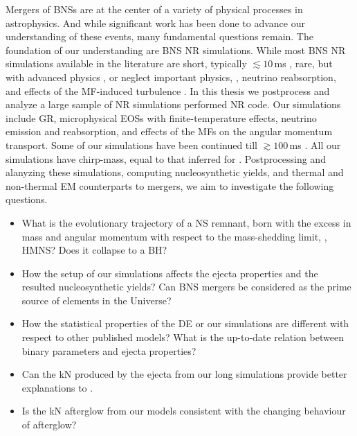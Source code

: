 Mergers of \acp{BNS} are at the center of a variety of 
physical processes in astrophysics. And while significant work 
has been done to advance our understanding of these events, many 
fundamental questions remain. 
%
The foundation of our understanding are \ac{BNS} \ac{NR} simulations.
While most \ac{BNS} \ac{NR} simulations available in the literature 
are short, typically ${\lesssim}10\,$ms \pmerg, rare, but with 
advanced physics \citep[\eg][]{Vincent:2019kor}, 
or neglect important physics, \eg, neutrino reabsorption, 
and effects of the \ac{MF}-induced turbulence \citep[\eg][]{Lehner:2016lxy}. 
%
In this thesis we postprocess and analyze a large sample of 
\ac{NR} simulations performed \wisky{} \ac{NR} code.
Our simulations include \ac{GR}, microphysical \acp{EOS} with finite-temperature 
effects, neutrino emission and reabsorption, and effects of the 
\acp{MF} on the angular momentum transport. Some of 
our simulations have been continued till ${\gtrsim}100\,$ms \pmerg{}. 
All our simulations have chirp-mass, equal to that inferred for 
\GW{}. 
%
Postprocessing and alanyzing these simulations, 
computing \rproc{} nucleosynthetic yields, 
and thermal and non-thermal \ac{EM} counterparts to mergers, 
we aim to investigate the following questions.

\begin{itemize}
    \item What is the evolutionary trajectory of a \ac{NS} remnant, born with 
    the excess in mass and angular momentum with respect to the mass-shedding 
    limit, \ie, \ac{HMNS}? Does it collapse to a \ac{BH}?
    \item How the setup of our simulations affects the ejecta properties and 
    the resulted nucleosynthetic yields? Can \ac{BNS} mergers be considered as 
    the prime source of \rproc{} elements in the Universe?
    \item How the statistical properties of the \ac{DE} or our simulations 
    are different with respect to other published models? What is the 
    up-to-date relation between binary parameters and ejecta properties?
    \item Can the \ac{kN} produced by the ejecta from our long simulations 
    provide better explanations to \AT{}.
    \item Is the \ac{kN} afterglow from our models consistent 
    with the changing behaviour of \GRB{} afterglow?
\end{itemize}


